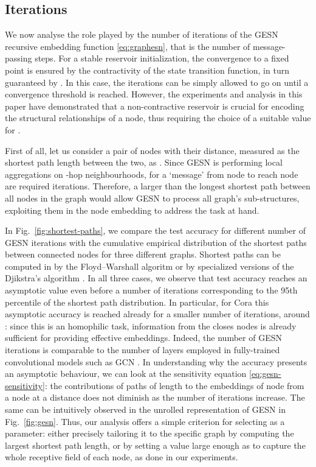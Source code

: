 \documentclass[final,5p,times,twocolumn]{elsarticle}
\begin{document}
\subsection{Iterations}

We now analyse the role played by the number of iterations  of the GESN recursive embedding function \eqref{eq:graphesn}, that is the number of message-passing steps.
For a stable reservoir initialization, the convergence to a fixed point is ensured by the contractivity of the state transition function, in turn guaranteed by .
In this case, the iterations can be simply allowed to go on until a convergence threshold is reached.
However, the experiments and analysis in this paper have demonstrated that a non-contractive reservoir is crucial for encoding the structural relationships of a node, thus requiring the choice of a suitable value for .

First of all, let us consider a pair of nodes  with their distance, measured as the shortest path length between the two, as .
Since GESN is performing local aggregations on -hop neighbourhoods, for a `message' from node  to reach node  are required  iterations.
Therefore, a  larger than the longest shortest path between all nodes in the graph would allow GESN to process all graph's sub-structures, exploiting them in the node embedding to address the task at hand.

In Fig.~\ref{fig:shortest-paths}, we compare the test accuracy for different number of GESN iterations with the cumulative empirical distribution of the shortest paths between connected nodes for three different graphs.
Shortest paths can be computed in  by the Floyd--Warshall algoritm \cite{Floyd1962} or by specialized versions of the Djikstra's algorithm \cite{Ahuja1990}.
In all three cases, we observe that test accuracy reaches an asymptotic value even before a number of iterations corresponding to the 95th percentile of the shortest path distribution.
In particular, for Cora this asymptotic accuracy is reached already for a smaller number of iterations, around : since this is an homophilic task, information from the closes nodes is already sufficient for providing effective embeddings.
Indeed, the number of GESN iterations is comparable to the number of layers employed in fully-trained convolutional models such as GCN \cite{Li2018}.
In understanding why the accuracy presents an asymptotic behaviour, we can look at the sensitivity equation \eqref{eq:gesn-sensitivity}: the contributions of paths of length  to the embeddings of node  from a node  at a distance  does not diminish as the number of iterations increase.
The same can be intuitively observed in the unrolled representation of GESN in Fig.~\ref{fig:gesn}.
Thus, our analysis offers a simple criterion for selecting  as a parameter: either precisely tailoring it to the specific graph by computing the largest shortest path length, or by setting a value large enough as to capture the whole receptive field of each node, as done in our experiments.
\end{document}
